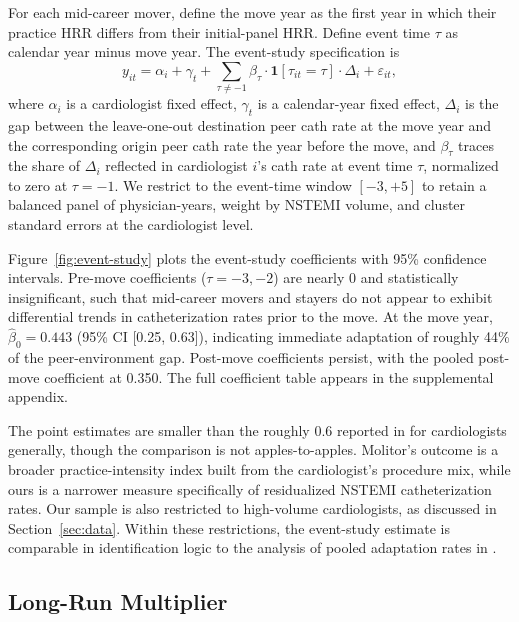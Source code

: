 \documentclass[12pt]{article}
\let\textcite\citet
\begin{document}
For each mid-career mover, define the move year as the first year in which their practice HRR differs from their initial-panel HRR. Define event time $\tau$ as calendar year minus move year. The event-study specification is
\begin{equation}\label{eq:es}
y_{it} = \alpha_i + \gamma_t + \sum_{\tau \neq -1} \beta_\tau \cdot \mathbf{1}[\tau_{it} = \tau] \cdot \Delta_i + \varepsilon_{it},
\end{equation}
where $\alpha_i$ is a cardiologist fixed effect, $\gamma_t$ is a calendar-year fixed effect, $\Delta_i$ is the gap between the leave-one-out destination peer cath rate at the move year and the corresponding origin peer cath rate the year before the move, and $\beta_\tau$ traces the share of $\Delta_i$ reflected in cardiologist $i$'s cath rate at event time $\tau$, normalized to zero at $\tau = -1$. We restrict to the event-time window $[-3, +5]$ to retain a balanced panel of physician-years, weight by NSTEMI volume, and cluster standard errors at the cardiologist level.

Figure~\ref{fig:event-study} plots the event-study coefficients with 95\% confidence intervals. Pre-move coefficients ($\tau = -3, -2$) are nearly 0 and statistically insignificant, such that mid-career movers and stayers do not appear to exhibit differential trends in catheterization rates prior to the move. At the move year, $\hat\beta_0 = 0.443$ (95\% CI [0.25, 0.63]), indicating immediate adaptation of roughly 44\% of the peer-environment gap. Post-move coefficients persist, with the pooled post-move coefficient at 0.350. The full coefficient table appears in the supplemental appendix.

The point estimates are smaller than the roughly 0.6 reported in \textcite{molitor2018} for cardiologists generally, though the comparison is not apples-to-apples. Molitor's outcome is a broader practice-intensity index built from the cardiologist's procedure mix, while ours is a narrower measure specifically of residualized NSTEMI catheterization rates. Our sample is also restricted to high-volume cardiologists, as discussed in Section~\ref{sec:data}. Within these restrictions, the event-study estimate is comparable in identification logic to the analysis of pooled adaptation rates in \textcite{molitor2018}.

\subsection{Long-Run Multiplier}\label{sec:policy}
\end{document}
